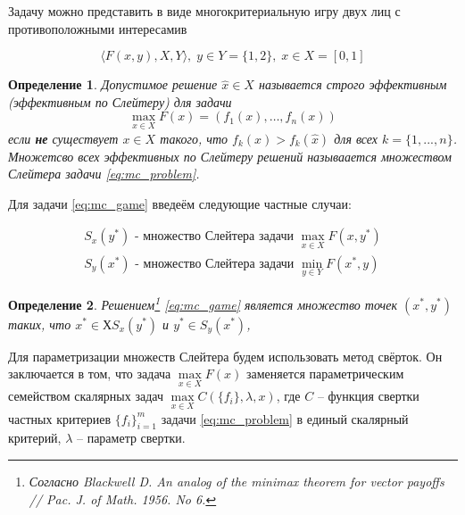 \vspace{5mm} 
Задачу можно представить в виде многокритериальную игру двух лиц 
с противоположными интересамив 

\begin{equation}
	\bigg \langle F(x,y), X, Y \bigg \rangle, \; y \in Y=\{1, 2\}, \; x \in {X}=[0, 1]
	\label{eq:mc_game}
\end{equation}

\newtheorem{Def}{Определение}
\begin{Def}
	Допустимое решение $\hat{x}\in{X}$ называется 
	строго эффективным (эффективным по Слейтеру) для задачи
	\begin{equation}
		\max\limits_{x \in X} F(x)=({f}_1(x),\ldots, {f}_n(x))
		\label{eq:mc_problem}
	\end{equation}
	если \textbf{не} существует $x\in{X}$ такого, что 
	$f_k(x)>f_k(\hat{x})$ для всех $k=\{1,...,n\}$. Множетсво всех эффективных по
	Слейтеру решений называается \textit{множеством Слейтера} задачи \eqref{eq:mc_problem}.
\end{Def}

Для задачи \eqref{eq:mc_game} введеём следующие частные случаи:

\begin{gather*}
	S_x(y^*) \textrm{ - множество Слейтера задачи } \max\limits_{x \in X} F(x, y^*) \\
	S_y(x^*) \textrm{ - множество Слейтера задачи } \min\limits_{y \in Y} F(x^*, y)
\end{gather*}

\begin{Def}
	Решением\footnote {
	Согласно \textit{Blackwell D.} An analog of the minimax theorem for
    vector payoffs // Pac. J. of Math. 1956. No 6.
	} 
	\eqref{eq:mc_game} является множество точек $(x^*, y^*)$ таких, что
    $x^* \in Х S_x(y^*) $ и $ y^*  \in S_y (x^*)$, 
\end{Def}

\vspace{5mm}

Для параметризации множеств Слейтера будем использовать метод свёрток.
Он заключается в том, что задача $\max\limits_{x \in X} F(x)$ заменяется параметрическим 
семейством скалярных задач $\max\limits_{x \in X} C(\{f_i\}, \lambda, x)$,
где $C$ – функция свертки частных критериев $\{f_i\}_{i=1}^m$ задачи 
\eqref{eq:mc_problem} в единый скалярный критерий, $\lambda$ – параметр свертки. 

